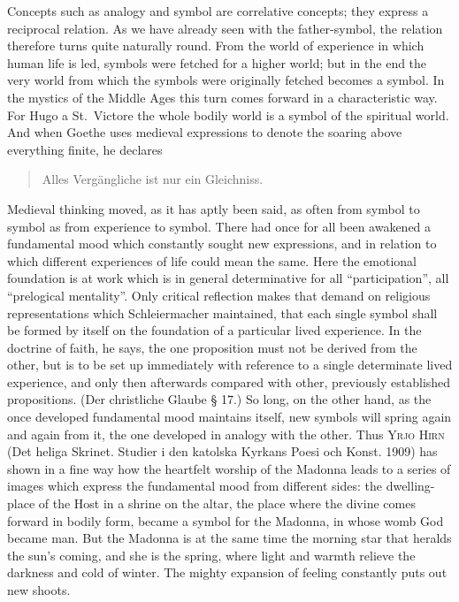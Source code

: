\documentclass[12pt]{book}
\newcommand{\opage}[1]{\marginnote{\footnotesize\textit{[#1]}}}
\begin{document}
Concepts such as analogy and symbol are correlative concepts; they express a
reciprocal relation. As we have already seen with the father-symbol, the
relation therefore turns quite naturally round. From the world of experience in
which human life is led, symbols were fetched for a higher world; but in the end
the very world from which the symbols were originally fetched becomes a symbol.
In the mystics of the Middle Ages this turn comes forward in a characteristic
way. For Hugo a St.\ Victore the whole bodily world is a symbol of the spiritual
world. And when Goethe uses \opage{35}medieval expressions to denote the soaring above
everything finite, he declares

\begin{verse}
Alles Vergängliche ist nur ein Gleichniss.
\end{verse}

Medieval thinking moved, as it has aptly been said, as often from symbol to
symbol as from experience to symbol. There had once for all been awakened a
fundamental mood which constantly sought new expressions, and in relation to
which different experiences of life could mean the same. Here the emotional
foundation is at work which is in general determinative for all
``participation'', all ``prelogical mentality''. Only critical reflection makes
that demand on religious representations which Schleiermacher maintained, that
each single symbol shall be formed by itself on the foundation of a particular
lived experience. In the doctrine of faith, he says, the one proposition must
not be derived from the other, but is to be set up immediately with reference to
a single determinate lived experience, and only then afterwards compared with
other, previously established propositions. (Der christliche Glaube § 17.) So
long, on the other hand, as the once developed fundamental mood maintains
itself, new symbols will spring again and again from it, the one developed in
analogy with the other. Thus \textsc{Yrjo Hirn} (Det heliga Skrinet. Studier i
den katolska Kyrkans Poesi och Konst. 1909) has shown in a fine way how the
heartfelt worship of the Madonna leads to a series of images which express the
fundamental mood from different sides: the dwelling-place of the Host in a
shrine on the altar, the place where the divine comes forward in bodily form,
became a symbol for the Madonna, in whose womb God became man. But the Madonna
is at the same time the morning star that heralds the sun's coming, and she is
the spring, where light and warmth relieve the darkness and cold of winter. The
mighty expansion of feeling constantly puts out new shoots.
\end{document}
